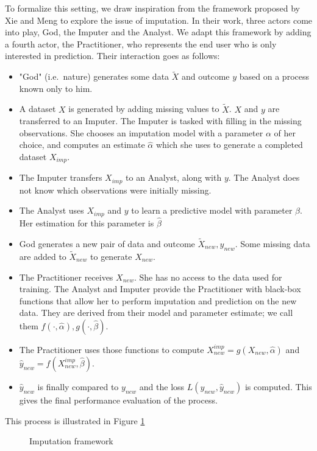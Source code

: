 To formalize this setting, we draw inspiration from the framework proposed by Xie and Meng \cite{xie2017framework} to explore the issue of imputation. In their work, three actors come into play, God, the Imputer and the Analyst. We adapt this framework by adding a fourth actor, the Practitioner, who represents the end user who is only interested in prediction. Their interaction goes as follows:
\begin{itemize}
 \item "God" (i.e.\ nature) generates some data $\tilde{X}$ and outcome $y$ based on a process known only to him. 
 \item A dataset $X$ is generated by adding missing values to $\tilde{X}$. $X$ and $y$ are transferred to an Imputer. The Imputer is tasked with filling in the missing observations. She chooses an imputation model with a parameter $\alpha$ of her choice, and computes an estimate $\hat{\alpha}$ which she uses to generate a completed dataset $X_{imp}$.
 \item The Imputer transfers $X_{imp}$ to an Analyst, along with $y$. The Analyst does not know which observations were initially missing.
 \item The Analyst uses $X_{imp}$ and $y$ to learn a predictive model with parameter $\beta$. Her estimation for this parameter is $\hat{\beta}$
 \item God generates a new pair of data and outcome $\tilde{X}_{new}, y_{new}$. Some missing data are added to
 $\tilde{X}_{new}$ to generate $X_{new}$.
 \item The Practitioner receives $X_{new}$. She has no access to the data used for training. The Analyst and Imputer provide the Practitioner with black-box functions that allow her to perform imputation and prediction on the new data. They are derived from their model and parameter estimate; we call them $f(\cdot,\hat{\alpha}),g(\cdot,\hat{\beta})$.
 \item The Practitioner uses those functions to compute $X_{new}^{imp} = g(X_{new},\hat{\alpha})$ and $\hat{y}_{new}= f(X_{new}^{imp},\hat{\beta})$.
 \item $\hat{y}_{new}$ is finally compared to $y_{new}$ and the loss $L(y_{new}, \hat{y}_{new})$ is computed. This gives the final performance evaluation of the process.
\end{itemize}

This process is illustrated in Figure \ref{fig.tikz_imp}

\begin{figure}[H]
 \caption{Imputation framework}
 \label{fig.tikz_imp}
\end{figure}

